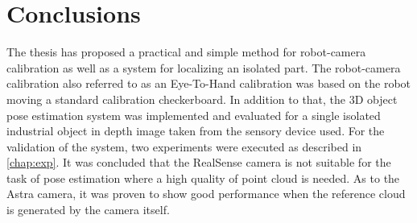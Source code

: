 \chapter{Conclusions}
\label{chap:con}

The thesis has proposed a practical and simple method for robot-camera calibration as well as a system for localizing an isolated part. The robot-camera calibration also referred to as an Eye-To-Hand calibration was based on the robot moving a standard calibration checkerboard. In addition to that, the 3D object pose estimation system was implemented and evaluated for a single isolated industrial object in depth image taken from the sensory device used. For the validation of the system, two experiments were executed as described in \ref{chap:exp}. It was concluded that the RealSense camera is not suitable for the task of pose estimation where a high quality of point cloud is needed. As to the Astra camera, it was proven to show good performance when the reference cloud is generated by the camera itself.

